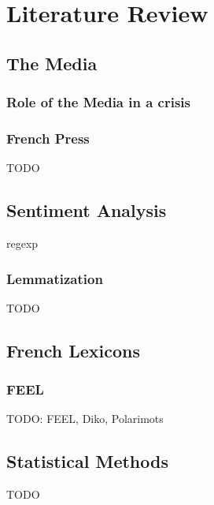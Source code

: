 \chapter{Literature Review}\label{Literature Review}

\section{The Media}

\subsection{Role of the Media in a crisis}\label{Role of the Media in a crisis}

\subsection{French Press}\label{chap:French Press}
TODO

\section{Sentiment Analysis}\label{Sentiment Analysis}

regexp 

\subsection{Lemmatization}\label{lemmatization}

TODO

\section{French Lexicons}\label{French Lexicons}

\subsection{FEEL}\label{chap: feel}
TODO: FEEL, Diko, Polarimots

\section{Statistical Methods}\label{Statistical Methods}

TODO
